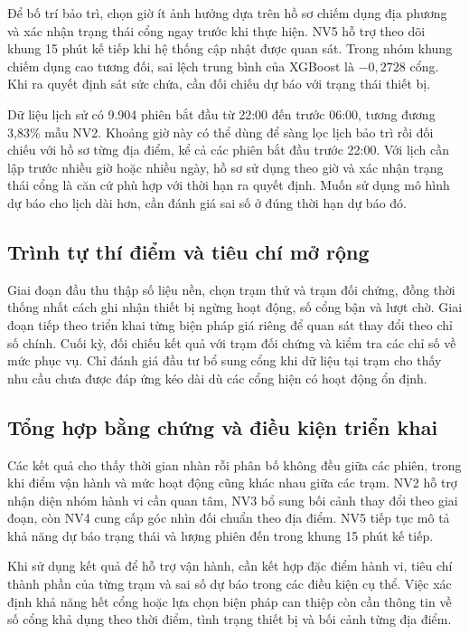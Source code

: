 \documentclass[conference,a4paper]{IEEEtran}
\begin{document}
Để bố trí bảo trì, chọn giờ ít ảnh hưởng dựa trên hồ sơ chiếm dụng địa phương và xác nhận trạng thái cổng ngay trước khi thực hiện. NV5 hỗ trợ theo dõi khung 15 phút kế tiếp khi hệ thống cập nhật được quan sát. Trong nhóm khung chiếm dụng cao tương đối, sai lệch trung bình của XGBoost là $-0{,}2728$ cổng. Khi ra quyết định sát sức chứa, cần đối chiếu dự báo với trạng thái thiết bị.

Dữ liệu lịch sử có 9.904 phiên bắt đầu từ 22:00 đến trước 06:00, tương đương 3,83\% mẫu NV2. Khoảng giờ này có thể dùng để sàng lọc lịch bảo trì rồi đối chiếu với hồ sơ từng địa điểm, kể cả các phiên bắt đầu trước 22:00. Với lịch cần lập trước nhiều giờ hoặc nhiều ngày, hồ sơ sử dụng theo giờ và xác nhận trạng thái cổng là căn cứ phù hợp với thời hạn ra quyết định. Muốn sử dụng mô hình dự báo cho lịch dài hơn, cần đánh giá sai số ở đúng thời hạn dự báo đó.

\subsection{Trình tự thí điểm và tiêu chí mở rộng}
Giai đoạn đầu thu thập số liệu nền, chọn trạm thử và trạm đối chứng, đồng thời thống nhất cách ghi nhận thiết bị ngừng hoạt động, số cổng bận và lượt chờ. Giai đoạn tiếp theo triển khai từng biện pháp giá riêng để quan sát thay đổi theo chỉ số chính. Cuối kỳ, đối chiếu kết quả với trạm đối chứng và kiểm tra các chỉ số về mức phục vụ. Chỉ đánh giá đầu tư bổ sung cổng khi dữ liệu tại trạm cho thấy nhu cầu chưa được đáp ứng kéo dài dù các cổng hiện có hoạt động ổn định.

\subsection{Tổng hợp bằng chứng và điều kiện triển khai}

Các kết quả cho thấy thời gian nhàn rỗi phân bố không đều giữa các phiên, trong khi điểm vận hành và mức hoạt động cũng khác nhau giữa các trạm. NV2 hỗ trợ nhận diện nhóm hành vi cần quan tâm, NV3 bổ sung bối cảnh thay đổi theo giai đoạn, còn NV4 cung cấp góc nhìn đối chuẩn theo địa điểm. NV5 tiếp tục mô tả khả năng dự báo trạng thái và lượng phiên đến trong khung 15 phút kế tiếp.

Khi sử dụng kết quả để hỗ trợ vận hành, cần kết hợp đặc điểm hành vi, tiêu chí thành phần của từng trạm và sai số dự báo trong các điều kiện cụ thể. Việc xác định khả năng hết cổng hoặc lựa chọn biện pháp can thiệp còn cần thông tin về số cổng khả dụng theo thời điểm, tình trạng thiết bị và bối cảnh từng địa điểm.
\end{document}
